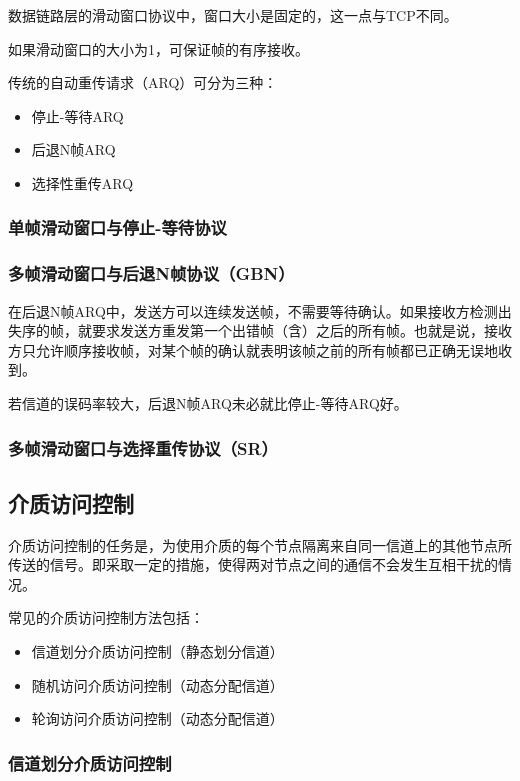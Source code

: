 \documentclass[12pt, a4paper, oneside]{ctexart}
\begin{document}
数据链路层的滑动窗口协议中，窗口大小是固定的，这一点与TCP不同。

如果滑动窗口的大小为1，可保证帧的有序接收。

传统的自动重传请求（ARQ）可分为三种：
\begin{itemize}
    \item 停止-等待ARQ
    \item 后退N帧ARQ
    \item 选择性重传ARQ
\end{itemize}

\subsubsection{单帧滑动窗口与停止-等待协议}

\subsubsection{多帧滑动窗口与后退N帧协议（GBN）}

在后退N帧ARQ中，发送方可以连续发送帧，不需要等待确认。如果接收方检测出失序的帧，就要求发送方重发第一个出错帧（含）之后的所有帧。也就是说，接收方只允许顺序接收帧，对某个帧的确认就表明该帧之前的所有帧都已正确无误地收到。

若信道的误码率较大，后退N帧ARQ未必就比停止-等待ARQ好。

\subsubsection{多帧滑动窗口与选择重传协议（SR）}

\subsection{介质访问控制}

介质访问控制的任务是，为使用介质的每个节点隔离来自同一信道上的其他节点所传送的信号。即采取一定的措施，使得两对节点之间的通信不会发生互相干扰的情况。

常见的介质访问控制方法包括：
\begin{itemize}
    \item 信道划分介质访问控制（静态划分信道）
    \item 随机访问介质访问控制（动态分配信道）
    \item 轮询访问介质访问控制（动态分配信道）
\end{itemize}

\subsubsection{信道划分介质访问控制}
\end{document}
